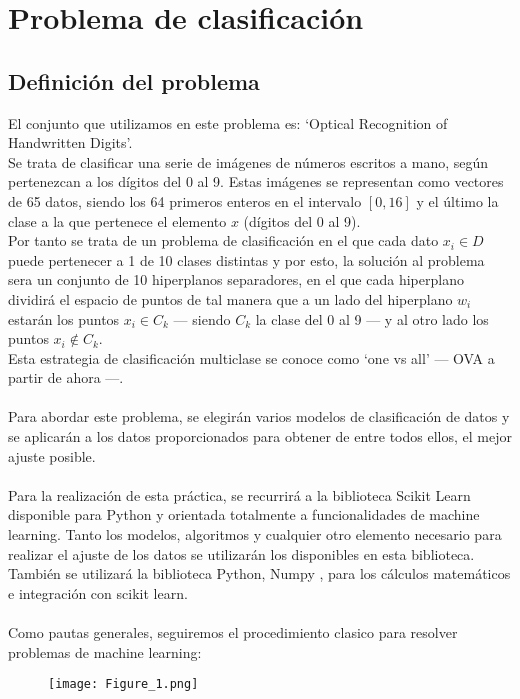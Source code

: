 \chapter{Problema de clasificación}
\section{Definición del problema}
El conjunto que utilizamos en este problema es: `Optical Recognition of Handwritten Digits'. \cite{Optical}\\
Se trata de clasificar una serie de imágenes de números escritos a mano, según pertenezcan a los dígitos del 0 al 9. Estas imágenes se representan como vectores de 65 datos, siendo los 64 primeros enteros en el intervalo $[0,16]$ y el último la clase a la que pertenece el elemento $x$ (dígitos del 0 al 9).\\
Por tanto se trata de un problema de clasificación en el que cada dato $x_i \in D$ puede pertenecer a 1 de 10 clases distintas y por esto, la solución al problema sera un conjunto de 10 hiperplanos separadores, en el que cada hiperplano dividirá el espacio de puntos de tal manera que a un lado del hiperplano $w_i$ estarán los puntos $x_i \in C_k$ --- siendo $C_k$ la clase del 0 al 9 --- y al otro lado los puntos $x_i \notin C_k$.\\
Esta estrategia de clasificación multiclase se conoce como `one vs all' --- OVA a partir de ahora ---.
\\\\
Para abordar este problema, se elegirán varios modelos de clasificación de datos y se aplicarán a los datos proporcionados para obtener de entre todos ellos, el mejor ajuste posible.\\
\\
Para la realización de esta práctica, se recurrirá a la biblioteca Scikit Learn \cite{SkUG} \cite{SkAPI} disponible para Python y orientada totalmente a funcionalidades de machine learning. Tanto los modelos, algoritmos y cualquier otro elemento necesario para realizar el ajuste de los datos se utilizarán los disponibles en esta biblioteca. También se utilizará la biblioteca Python, Numpy \cite{Numpy}, para los cálculos matemáticos e integración con scikit learn.\\
\\
Como pautas generales, seguiremos el procedimiento clasico para resolver problemas de machine learning:

\begin{figure}[h]
   \centering
   \texttt{[image: Figure\_1.png]}
\end{figure}

